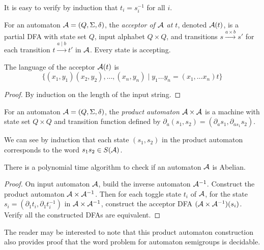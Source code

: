 \documentclass[11pt, titlepage]{article}
\begin{document}
It is easy to verify by induction that $t_i = s_i^{-1}$ for all $i$.

\begin{definition}
  For an automaton $\mathcal{A} = (Q,\Sigma, \delta)$, the \emph{acceptor of
    $\mathcal{A}$ at $t$}, denoted $\mathcal{A}(t)$, is a partial DFA with state set
  $Q$, input alphabet $Q \times Q$, and transitions
  $s \stackrel{a \times b}{\longrightarrow} s'$ for each transition
  $t \stackrel{a \mid b}{\longrightarrow} t'$ in $\mathcal{A}$. Every state is
  accepting.
\end{definition}

\begin{lemma}
  The language of the acceptor $\mathcal{A}(t)$ is
  \[
    \{(x_1, y_1)(x_2, y_2),\ldots,(x_n, y_n) \mid y_1\ldots y_n =
    (x_1,\ldots x_n)t \}
  \]
\end{lemma}
\begin{proof}
  By induction on the length of the input string.
\end{proof}

\begin{definition}
  For an automaton $\mathcal{A} = (Q, \Sigma, \delta)$, the \emph{product
    automaton} $\mathcal{A} \times \mathcal{A}$ is a machine with state set $Q\times Q$
  and transition function defined by
  $\partial_a (s_1, s_2) = (\partial_a s_1, \partial_{a s_1} s_2)$.
\end{definition}

We can see by induction that each state $(s_1, s_2)$ in the product
automaton corresponds to the word $s_1 s_2 \in S(\mathcal{A})$.

\begin{theorem}
  There is a polynomial time algorithm to check if an automaton $\mathcal{A}$
  is Abelian.
\end{theorem}

\begin{proof}
  On input automaton $\mathcal{A}$, build the inverse automaton
  $\mathcal{A}^{-1}$. Construct the product automaton $\mathcal{A}\times \mathcal{A}^{-1}$. Then
  for each toggle state $t_i$ of $\mathcal{A}$, for the state
  $s_i = (\partial_1 t_i, \partial_1 t_i^{-1})$ in $\mathcal{A}\times \mathcal{A}^{-1}$,
  construct the acceptor DFA $(\mathcal{A}\times \mathcal{A}^{-1})(s_i)$. Verify all the
  constructed DFAs are equivalent.
\end{proof}

The reader may be interested to note that this product automaton
construction also provides proof that the word problem for automaton
semigroups is decidable.
\end{document}
